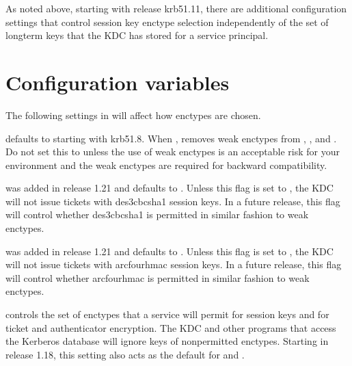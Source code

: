 \documentclass[letterpaper,10pt,english]{sphinxmanual}
\begin{document}
\sphinxAtStartPar
As noted above, starting with release krb5\sphinxhyphen{}1.11, there are additional
configuration settings that control session key enctype selection
independently of the set of long\sphinxhyphen{}term keys that the KDC has stored for
a service principal.


\section{Configuration variables}
\label{\detokenize{admin/enctypes:configuration-variables}}
\sphinxAtStartPar
The following \sphinxcode{\sphinxupquote{{[}libdefaults{]}}} settings in {\hyperref[\detokenize{admin/conf_files/krb5_conf:krb5-conf-5}]{}} will
affect how enctypes are chosen.
\begin{description}
\sphinxAtStartPar
defaults to  starting with krb5\sphinxhyphen{}1.8.  When , removes
weak enctypes from ,
, and .  Do not
set this to  unless the use of weak enctypes is an
acceptable risk for your environment and the weak enctypes are
required for backward compatibility.

\sphinxAtStartPar
was added in release 1.21 and defaults to .  Unless this
flag is set to , the KDC will not issue tickets with
des3\sphinxhyphen{}cbc\sphinxhyphen{}sha1 session keys.  In a future release, this flag will
control whether des3\sphinxhyphen{}cbc\sphinxhyphen{}sha1 is permitted in similar fashion to
weak enctypes.

\sphinxAtStartPar
was added in release 1.21 and defaults to .  Unless this
flag is set to , the KDC will not issue tickets with
arcfour\sphinxhyphen{}hmac session keys.  In a future release, this flag will
control whether arcfour\sphinxhyphen{}hmac is permitted in similar fashion to
weak enctypes.

\sphinxAtStartPar
controls the set of enctypes that a service will permit for
session keys and for ticket and authenticator encryption.  The KDC
and other programs that access the Kerberos database will ignore
keys of non\sphinxhyphen{}permitted enctypes.  Starting in release 1.18, this
setting also acts as the default for  and
.


\end{description}
\end{document}

